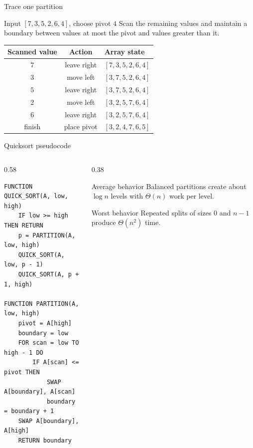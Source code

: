\documentclass[aspectratio=169]{beamer}
\begin{document}
\begin{frame}{Trace one partition}
  \small
  \begin{block}{Input $[7,3,5,2,6,4]$, choose pivot $4$}
    Scan the remaining values and maintain a boundary between values at most
    the pivot and values greater than it.
  \end{block}
  \begin{center}
    \begin{tabular}{ccl}
      \toprule
      \textbf{Scanned value} & \textbf{Action} & \textbf{Array state} \\
      \midrule
      $7$ & leave right & $[7,3,5,2,6,4]$ \\
      $3$ & move left & $[3,7,5,2,6,4]$ \\
      $5$ & leave right & $[3,7,5,2,6,4]$ \\
      $2$ & move left & $[3,2,5,7,6,4]$ \\
      $6$ & leave right & $[3,2,5,7,6,4]$ \\
      finish & place pivot & $[3,2,4,7,6,5]$ \\
      \bottomrule
    \end{tabular}
  \end{center}
\end{frame}

\begin{frame}[fragile]{Quicksort pseudocode}
  \begin{columns}[T]
    \begin{column}{0.58\textwidth}
\begin{lstlisting}[style=pseudo]
FUNCTION QUICK_SORT(A, low, high)
    IF low >= high THEN RETURN
    p = PARTITION(A, low, high)
    QUICK_SORT(A, low, p - 1)
    QUICK_SORT(A, p + 1, high)

FUNCTION PARTITION(A, low, high)
    pivot = A[high]
    boundary = low
    FOR scan = low TO high - 1 DO
        IF A[scan] <= pivot THEN
            SWAP A[boundary], A[scan]
            boundary = boundary + 1
    SWAP A[boundary], A[high]
    RETURN boundary
\end{lstlisting}
    \end{column}
    \begin{column}{0.38\textwidth}
      \begin{exampleblock}{Average behavior}
        Balanced partitions create about $\log n$ levels with $\Theta(n)$ work
        per level.
      \end{exampleblock}
      \begin{alertblock}{Worst behavior}
        Repeated splits of sizes $0$ and $n-1$ produce $\Theta(n^2)$ time.
      \end{alertblock}
    \end{column}
  \end{columns}
\end{frame}
\end{document}

